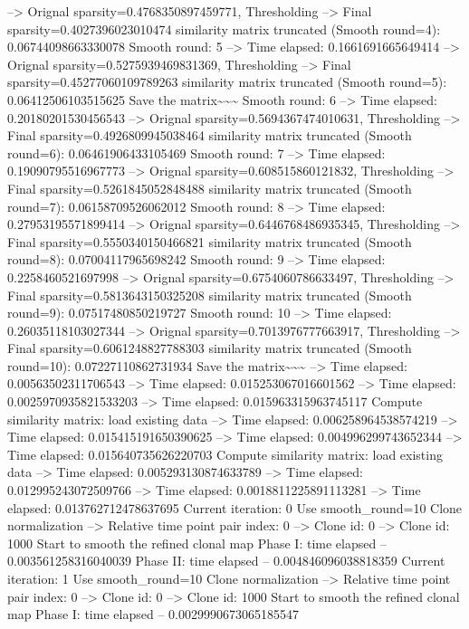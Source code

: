 \documentclass[letterpaper,10pt,english]{sphinxmanual}
\begin{document}
{\begin{sphinxVerbatim}[commandchars=\\\{\}]
--> Orignal sparsity=0.4768350897459771, Thresholding
--> Final sparsity=0.4027396023010474
similarity matrix truncated (Smooth round=4):  0.06744098663330078
Smooth round: 5
--> Time elapsed: 0.1661691665649414
--> Orignal sparsity=0.5275939469831369, Thresholding
--> Final sparsity=0.45277060109789263
similarity matrix truncated (Smooth round=5):  0.06412506103515625
Save the matrix\textasciitilde{}\textasciitilde{}\textasciitilde{}
Smooth round: 6
--> Time elapsed: 0.20180201530456543
--> Orignal sparsity=0.5694367474010631, Thresholding
--> Final sparsity=0.4926809945038464
similarity matrix truncated (Smooth round=6):  0.06461906433105469
Smooth round: 7
--> Time elapsed: 0.19090795516967773
--> Orignal sparsity=0.608515860121832, Thresholding
--> Final sparsity=0.5261845052848488
similarity matrix truncated (Smooth round=7):  0.06158709526062012
Smooth round: 8
--> Time elapsed: 0.27953195571899414
--> Orignal sparsity=0.6446768486935345, Thresholding
--> Final sparsity=0.5550340150466821
similarity matrix truncated (Smooth round=8):  0.07004117965698242
Smooth round: 9
--> Time elapsed: 0.2258460521697998
--> Orignal sparsity=0.6754060786633497, Thresholding
--> Final sparsity=0.5813643150325208
similarity matrix truncated (Smooth round=9):  0.07517480850219727
Smooth round: 10
--> Time elapsed: 0.26035118103027344
--> Orignal sparsity=0.7013976777663917, Thresholding
--> Final sparsity=0.6061248827788303
similarity matrix truncated (Smooth round=10):  0.07227110862731934
Save the matrix\textasciitilde{}\textasciitilde{}\textasciitilde{}
--> Time elapsed:  0.00563502311706543
--> Time elapsed:  0.015253067016601562
--> Time elapsed:  0.0025970935821533203
--> Time elapsed:  0.015963315963745117
Compute similarity matrix: load existing data
--> Time elapsed:  0.006258964538574219
--> Time elapsed:  0.015415191650390625
--> Time elapsed:  0.004996299743652344
--> Time elapsed:  0.015640735626220703
Compute similarity matrix: load existing data
--> Time elapsed:  0.005293130874633789
--> Time elapsed:  0.012995243072509766
--> Time elapsed:  0.0018811225891113281
--> Time elapsed:  0.013762712478637695
Current iteration: 0
Use smooth\_round=10
Clone normalization
--> Relative time point pair index: 0
--> Clone id: 0
--> Clone id: 1000
Start to smooth the refined clonal map
Phase I: time elapsed --  0.003561258316040039
Phase II: time elapsed --  0.004846096038818359
Current iteration: 1
Use smooth\_round=10
Clone normalization
--> Relative time point pair index: 0
--> Clone id: 0
--> Clone id: 1000
Start to smooth the refined clonal map
Phase I: time elapsed --  0.0029990673065185547

\end{sphinxVerbatim}}
\end{document}
